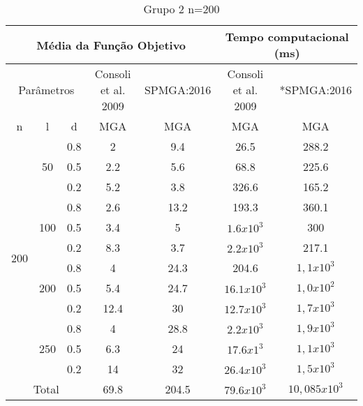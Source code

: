 \documentclass[12pt]{article}
\begin{document}
\begin{table}[]
\centering
\caption{Grupo 2 n=200}
\label{my-label}
\begin{tabular}{|c|c|c|c|c|c|c|}
\hline
\multicolumn{5}{|c|}{Média da Função Objetivo}                                       & \multicolumn{2}{c|}{Tempo computacional (ms)} \\ \hline
\multicolumn{3}{|c|}{Parâmetros}                   & Consoli et al. 2009 & SPMGA:2016 & Consoli et al. 2009        & *SPMGA:2016        \\ \hline
n                     & l                    & d   & MGA               & MGA         & MGA                      & MGA                \\ \hline
\multirow{12}{*}{200} & \multirow{3}{*}{50}  & 0.8 & 2                 & 9.4         & 26.5                     & 288.2              \\ \cline{3-7} 
                      &                      & 0.5 & 2.2               & 5.6         & 68.8                     & 225.6              \\ \cline{3-7} 
                      &                      & 0.2 & 5.2               & 3.8         & 326.6                    & 165.2              \\ \cline{2-7} 
                      & \multirow{3}{*}{100} & 0.8 & 2.6               & 13.2        & 193.3                    & 360.1              \\ \cline{3-7} 
                      &                      & 0.5 & 3.4               & 5           & $1.6x10^3$               & 300                \\ \cline{3-7} 
                      &                      & 0.2 & 8.3               & 3.7         & $2.2x10^3$               & 217.1              \\ \cline{2-7} 
                      & \multirow{3}{*}{200} & 0.8 & 4                 & 24.3        & 204.6                    & $1,1x10^3$         \\ \cline{3-7} 
                      &                      & 0.5 & 5.4               & 24.7        & $16.1x10^3$              & $1,0x10^2$         \\ \cline{3-7} 
                      &                      & 0.2 & 12.4              & 30          & $12.7x10^3$              & $1,7x10^3$         \\ \cline{2-7} 
                      & \multirow{3}{*}{250} & 0.8 & 4                 & 28.8        & $2.2x10^3$               & $1,9x10^3$         \\ \cline{3-7} 
                      &                      & 0.5 & 6.3               & 24          & $17.6x1^3$               & $1,1x10^3$         \\ \cline{3-7} 
                      &                      & 0.2 & 14                & 32          & $26.4x10^3$              & $1,5x10^3$         \\ \hline
\multicolumn{3}{|c|}{Total}                        & 69.8              & 204.5       & $79.6x10^3$              & $10,085x10^3$            \\ \hline
\end{tabular}
\end{table}
\end{document}
